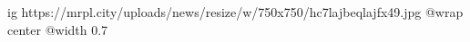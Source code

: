  
 
 
 
 

\ifcmt
  ig https://mrpl.city/uploads/news/resize/w/750x750/hc7lajbeqlajfx49.jpg
  @wrap center
  @width 0.7
\fi
